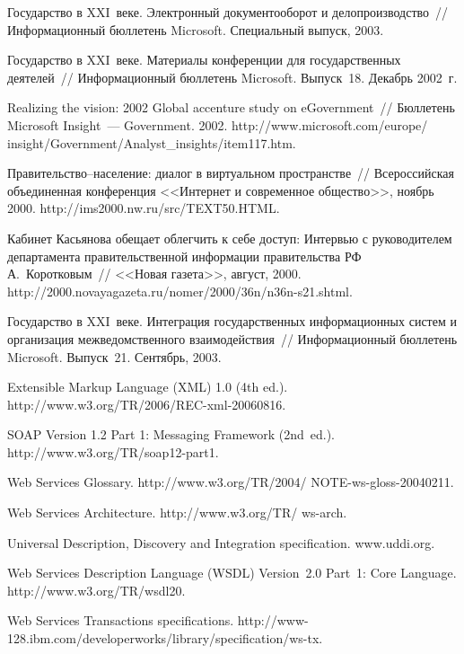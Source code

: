 \begin{multicols}{2}
{\small\frenchspacing
{%
\begin{thebibliography}{99}
Государство в XXI~веке. Электронный документооборот и делопроизводство~//
Информационный бюллетень Microsoft. Специальный выпуск, 2003.

Государство в XXI~веке. Материалы конференции для государственных деятелей~//
Информационный бюллетень Microsoft. Выпуск~18. Декабрь 2002~г.

Realizing the vision: 2002 Global accenture study on eGovernment~// Бюллетень Microsoft
Insight~--- Government.  2002. {\sf
http://www.microsoft.com/europe/ insight/Government/Analyst\_insights/item117.htm}.

Правительство--население: диалог в виртуальном пространстве~// Всероссийская
объединенная конференция <<Интернет и современное общество>>, ноябрь 2000. {\sf
http://ims2000.nw.ru/src/TEXT50.HTML}.

Кабинет Касьянова обещает облегчить к себе доступ: Интервью с руководителем
департамента правительственной информации правительства РФ А.~Коротковым~//
<<Новая газета>>, август, 2000.
{\sf http://2000.novayagazeta.ru/nomer/2000/36n/n36n-s21.shtml}.

Государство в XXI~веке. Интеграция государственных информационных систем и
организация межведомственного взаимодействия~// Информационный бюллетень
Microsoft. Выпуск~21. Сентябрь, 2003.

Extensible Markup Language (XML) 1.0 (4th ed.). {\sf
http://www.w3.org/TR/2006/REC-xml-20060816}.

SOAP Version 1.2 Part 1: Messaging Framework (2nd~ed.). {\sf
http://www.w3.org/TR/soap12-part1}.

Web Services Glossary. {\sf http://www.w3.org/TR/2004/ NOTE-ws-gloss-20040211}.

Web Services Architecture.  {\sf http://www.w3.org/TR/}\linebreak 
{\sf ws-arch}.

Universal Description, Discovery and Integration specification.
{\sf www.uddi.org}.

Web Services Description Language (WSDL) Version~2.0 Part~1: Core Language. {\sf
http://www.w3.org/TR/wsdl20}.

Web Services Transactions specifications.
{\sf http://www-128.ibm.com/developerworks/library/specification/ws-tx}.


\end{thebibliography}}}
\end{multicols}
